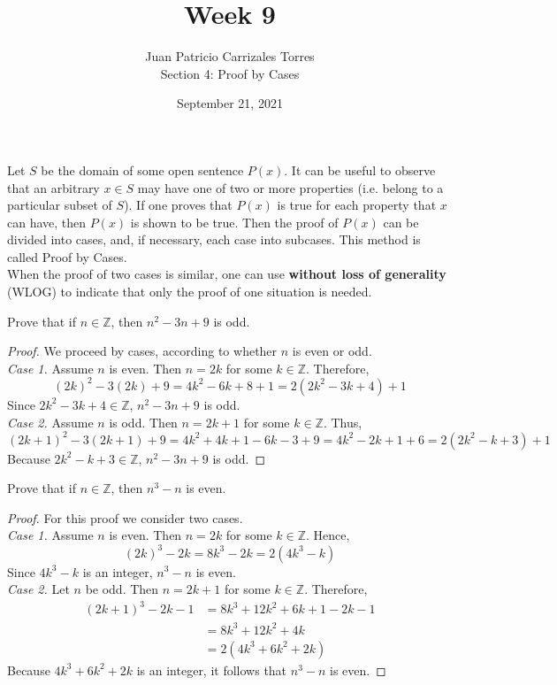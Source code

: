 \documentclass[12pt]{article}
\newcommand{\Z}{\mathbb{Z}}
\newenvironment{problem}[2][Problem]{\begin{trivlist}
		\item[\hskip \labelsep {\bfseries #1}\hskip \labelsep {\bfseries #2.}]}{\end{trivlist}}
\begin{document}
	
	\title{Week 9}
	\author{Juan Patricio Carrizales Torres \\
		Section 4: Proof by Cases}
	\date{September 21, 2021}
	\maketitle
	
Let $S$ be the domain of some open sentence $P(x)$. It can be useful to observe that an arbitrary $x\in S$ may have one of two or more properties (i.e. belong to a particular subset of $S$). If one proves that $P(x)$ is true for each property that $x$ can have, then $P(x)$ is shown to be true. Then the proof of $P(x)$ can be divided into cases, and, if necessary, each case into subcases. This method is called Proof by Cases.\\
When the proof of two cases is similar, one can use \textbf{without loss of generality} (WLOG) to indicate that only the proof of one situation is needed. 

\begin{problem}{26}
	Prove that if $n\in \Z$, then $n^{2}-3n+9$ is odd.
	\begin{proof}
		We proceed by cases, according to whether $n$ is even or odd.\\
		\textit{Case 1.} Assume $n$ is even. Then $n=2k$ for some $k\in \Z$. Therefore,
		\begin{equation*}
			(2k)^{2}-3(2k)+9=4k^{2}-6k+8+1=2(2k^{2}-3k+4)+1
		\end{equation*}
	Since $2k^{2}-3k+4\in \Z$, $n^{2}-3n+9$ is odd.\\
	\textit{Case 2.} Assume $n$ is odd. Then $n=2k+1$ for some $k\in \Z$. Thus,
	\begin{equation*}
		(2k+1)^{2}-3(2k+1)+9=4k^{2}+4k+1-6k-3+9=4k^{2}-2k+1+6 = 2(2k^{2}-k+3)+1
	\end{equation*}
	Because $2k^{2}-k+3\in \Z$, $n^{2}-3n+9$ is odd.
	\end{proof}
\end{problem}

\begin{problem}{27}
	Prove that if $n\in \Z$, then $n^{3}-n$ is even.
	\begin{proof}
		For this proof we consider two cases.\\
		\textit{Case 1.} Assume $n$ is even. Then $n=2k$ for some $k\in \Z$. Hence,
		\begin{equation*}
			(2k)^{3}-2k=8k^{3}-2k=2(4k^{3}-k)
		\end{equation*} 
		Since $4k^{3}-k$ is an integer, $n^{3}-n$ is even.\\
		\textit{Case 2.} Let $n$ be odd. Then $n=2k+1$ for some $k\in \Z$. Therefore,
		\begin{align*}
			(2k+1)^{3}-2k-1 &= 8k^{3}+12k^{2}+6k+1-2k-1\\
			&= 8k^{3}+12k^{2}+4k\\
			&= 2(4k^{3}+6k^{2}+2k)
		\end{align*}
	Because $4k^{3}+6k^{2}+2k$ is an integer, it follows that $n^{3}-n$ is even.
	\end{proof} 
\end{problem}
\end{document}
